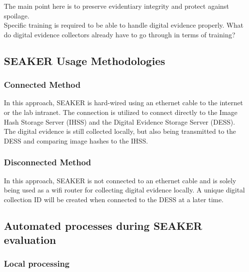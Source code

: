 \documentclass[12pt]{article}
\begin{document}
The main point here is to preserve evidentiary integrity and protect against spoilage.\\

Specific training is required to be able to handle digital evidence properly.  What do digital evidence collectors
already have to go through in terms of training?\\

\subsection{SEAKER Usage Methodologies}
\subsubsection{Connected Method}

In this approach, SEAKER is hard-wired using an ethernet cable to the internet or the lab intranet.  The connection
is utilized to connect directly to the Image Hash Storage Server (IHSS) and the Digital Evidence Storage Server (DESS).
The digital evidence is still collected locally, but also being transmitted to the DESS and comparing image hashes
to the IHSS.\\

\subsubsection{Disconnected Method}

In this approach, SEAKER is not connected to an ethernet cable and is solely being used as a wifi router for
collecting digital evidence locally.  A unique digital collection ID will be created when connected to the DESS
at a later time.

\subsection{Automated processes during SEAKER evaluation}

\subsubsection{Local processing}
\end{document}
